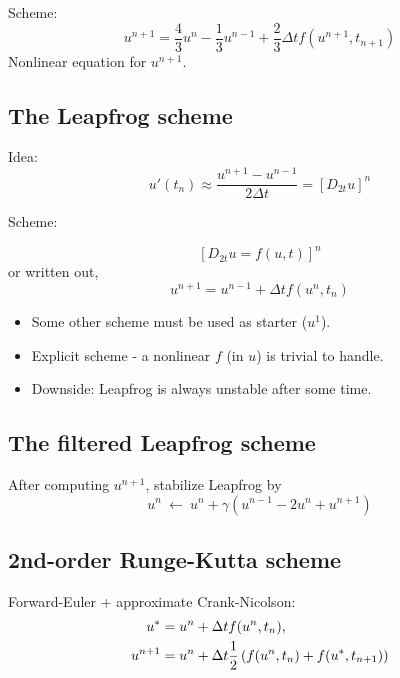 \documentclass[%
oneside,                 %
final,                   %
10pt]{article}
\begin{document}
Scheme:
\[ u^{n+1} = \frac{4}{3}u^n - \frac{1}{3}u^{n-1} +
\frac{2}{3}\Delta t f(u^{n+1}, t_{n+1})
\label{decay:fd2:bw:2step}
\]
Nonlinear equation for $u^{n+1}$.

\subsection*{The Leapfrog scheme}


Idea:
\begin{equation}
u'(t_n)\approx \frac{u^{n+1}-u^{n-1}}{2\Delta t} = [D_{2t} u]^n
\end{equation}

Scheme:

\[ [D_{2t} u = f(u,t)]^n\]
or written out,
\begin{equation}
u^{n+1} = u^{n-1} + \Delta t f(u^n, t_n)
\label{decay:fd2:leapfrog}
\end{equation}

\begin{itemize}
 \item Some other scheme must be used as starter ($u^1$).

 \item Explicit scheme - a nonlinear $f$ (in $u$) is trivial to handle.

 \item Downside: Leapfrog is always unstable after some time.
\end{itemize}

\noindent
\subsection*{The filtered Leapfrog scheme}


After computing $u^{n+1}$, stabilize Leapfrog by
\begin{equation}
u^n\ \leftarrow\ u^n + \gamma (u^{n-1} - 2u^n + u^{n+1})
\label{decay:fd2:leapfrog:filtered}
\end{equation}

\subsection*{2nd-order Runge-Kutta scheme}


Forward-Euler + approximate Crank-Nicolson:
\begin{align}
u^* &= u^n + \Delta t f(u^n, t_n),
\label{decay:fd2:RK2:s1}\\ 
u^{n+1} &= u^n + \Delta t \half \left( f(u^n, t_n) + f(u^*, t_{n+1})
\right)
\label{decay:fd2:RK2:s2}
\end{align}
\end{document}
